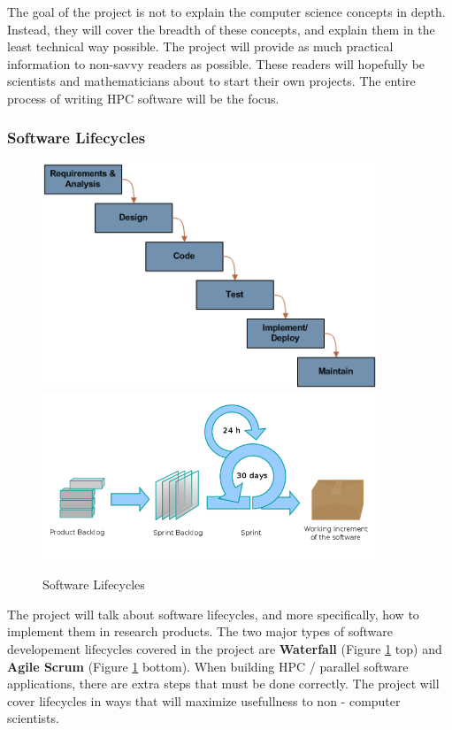 The goal of the project is not to explain the computer science concepts in
depth. Instead, they will cover the breadth of these concepts, and explain them
in the least technical way possible. The project will provide as much practical
information to non-savvy readers as possible. These readers will hopefully be 
scientists and mathematicians about to start their own projects. The entire
process of writing HPC software will be the focus.

\pagebreak

\subsubsection{Software Lifecycles}

\begin{figure}[h]
	\begin{center}
		\includegraphics[width=100mm]{images/waterfall.png}
		\includegraphics[width=100mm]{images/scrum.png}
		\caption{Software Lifecycles} 
		\label{lifecycles}
	\end{center}
\end{figure}

The project will talk about software lifecycles, and more specifically, how to
implement them in research products. The two major types of software 
developement lifecycles covered in the project are \textbf{Waterfall} (Figure 
\ref{lifecycles} top) and \textbf{Agile Scrum} (Figure \ref{lifecycles} 
bottom). When building HPC / parallel software applications, there are extra
steps that must be done correctly. The project will cover lifecycles in ways
that will maximize usefullness to non - computer scientists.


